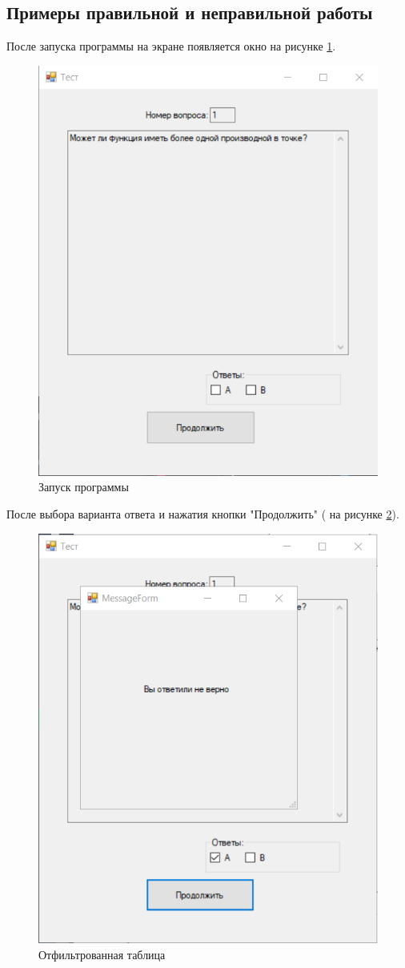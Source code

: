 \subsection{Примеры правильной и неправильной работы}
После запуска программы на экране появляется окно на рисунке \ref{task9_launch1}.
\begin{figure}[H]
    \centering
    \includegraphics[width=0.8\linewidth]{lections/img/task9_launch1.png}
    \caption{Запуск программы}
    \label{task9_launch1}
\end{figure}

После выбора варианта ответа и нажатия кнопки "Продолжить" ( на рисунке \ref{task9_launch2}).

\begin{figure}[H]
    \centering
    \includegraphics[width=0.8\linewidth]{lections/img/task9_launch2.png}
    \caption{Отфильтрованная таблица}
    \label{task9_launch2}
\end{figure}

